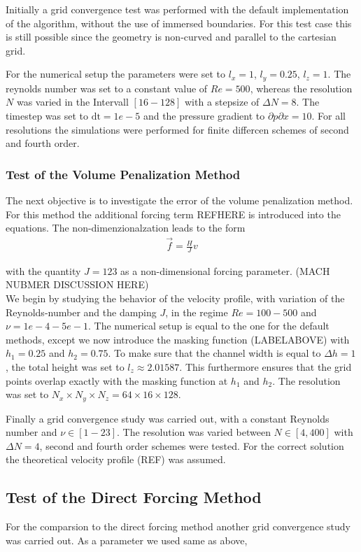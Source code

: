 Initially a grid convergence test was performed with the default
 implementation of the algorithm, without the use of immersed boundaries.
For this test case this is still possible since the geometry is non-curved
 and parallel to the cartesian grid.

For the  numerical setup the parameters were set to $l_x=1$, $l_y=0.25$, $l_z=1$.
The reynolds number was set to a constant value of $Re=500$, whereas the resolution $N$
 was varied in the Intervall $[16 - 128]$ with a stepsize of $\Delta N = 8$.
The timestep was set to $\mathrm{dt}=1e-5$ and the pressure gradient to $\partial p \partial x  = 10$.
For all resolutions the simulations were performed for finite differcen
schemes of second and fourth order.

\subsubsection{Test of the Volume Penalization Method}

The next objective is to investigate the error of the volume penalization method.
For this method the additional forcing term REFHERE is introduced into the equations. The non-dimenzionalzation leads to the form
\begin{align}
    \vec{f} = \frac{H}{J}v
\end{align}

with the quantity $J = 123$ as a non-dimensional forcing parameter.
(MACH NUBMER DISCUSSION HERE) \\
We begin by studying the behavior of the velocity profile, with variation of the Reynolds-number and the damping $J$, in the regime $Re=100-500$ and $\nu=1e-4 - 5e-1$.
The numerical setup is equal to the one for the default methods, except we now introduce the masking function (LABELABOVE) with $h_1=0.25$ and $h_2=0.75$.
To make sure that the channel width is equal to $\Delta h = 1$, the total height was set to $l_z\approx2.01587$. This furthermore ensures that the grid points overlap exactly
with the masking function at $h_1$ and $h_2$. The resolution was set to $N_x\times N_y\times N_z = 64\times16\times128$.

Finally a grid convergence study was carried out, with a constant Reynolds number and $\nu \in [1-23]$.
The resolution was varied between $N\in [4, 400]$ with $\Delta N = 4$, second and fourth order schemes were tested.
For the correct solution the theoretical velocity profile (REF) was assumed.

\subsection{Test of the Direct Forcing Method}
For the comparsion to the direct forcing method another grid convergence study was carried out.  As a parameter we used same as above,



